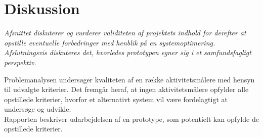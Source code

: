 \section{Diskussion}\label{sec:diskussion}
\textit{Afsnittet diskuterer og vurderer validiteten af projektets indhold%
 for derefter at opstille eventuelle forbedringer med henblik på en systemoptimering. Afslutningsvis diskuteres det, hvorledes prototypen egner sig i et samfundsfagligt perspektiv.}

Problemanalysen undersøger kvaliteten af en række aktivitetsmålere med hensyn til udvalgte kriterier. Det fremgår heraf, at ingen aktivitetsmålere opfylder alle opstillede kriterier, hvorfor et alternativt system vil være fordelagtigt at undersøge og udvikle. \\
Rapporten beskriver udarbejdelsen af en prototype, som potentielt kan opfylde de opstillede kriterier. 

